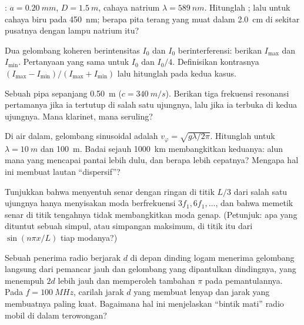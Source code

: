 \begin{exercise}[$\star\star$]\label{exo:b1:wave-propagation:7}
: $a = \qty{0.20}{mm}$, $D = \qty{1.5}{m}$, cahaya natrium
$\lambda = \qty{589}{nm}$. Hitunglah ; lalu untuk
cahaya biru pada \qty{450}{nm}; berapa pita terang yang muat dalam
\qty{2.0}{cm} di sekitar pusatnya dengan lampu natrium itu?
\end{exercise}

\begin{exercise}[$\star\star$]\label{exo:b1:wave-propagation:8}
Dua gelombang koheren berintensitas $I_0$ dan $I_0$ berinterferensi:
berikan $I_{\max}$ dan $I_{\min}$. Pertanyaan yang sama untuk $I_0$ dan
$I_0/4$. Definisikan kontrasnya
$(I_{\max} - I_{\min})/(I_{\max} + I_{\min})$ lalu hitunglah pada kedua kasus.
\end{exercise}

\begin{exercise}[$\star\star$]\label{exo:b1:wave-propagation:9}
Sebuah pipa sepanjang \qty{0.50}{m} ($c = \qty{340}{m/s}$). Berikan tiga
frekuensi resonansi pertamanya jika ia tertutup di salah satu ujungnya,
lalu jika ia terbuka di kedua ujungnya. Mana klarinet, mana seruling?
\end{exercise}

\begin{exercise}[$\star\star\star$]\label{exo:b1:wave-propagation:10}
Di air dalam,  gelombang sinusoidal adalah
$v_\varphi = \sqrt{g\lambda/2\pi}$. Hitunglah untuk $\lambda = \qty{10}{m}$
dan \qty{100}{m}. Badai sejauh \qty{1000}{km} membangkitkan keduanya:
alun mana yang mencapai pantai lebih dulu, dan berapa lebih cepatnya?
Mengapa hal ini membuat lautan ``dispersif''?
\end{exercise}

\begin{exercise}[$\star\star\star$]\label{exo:b1:wave-propagation:11}
Tunjukkan bahwa menyentuh senar dengan ringan di titik $L/3$ dari salah
satu ujungnya hanya menyisakan moda berfrekuensi $3f_1, 6f_1, \dots$,
dan bahwa memetik senar di titik tengahnya tidak membangkitkan moda
genap. (Petunjuk: apa yang dituntut sebuah simpul, atau simpangan
maksimum, di titik itu dari $\sin(n\pi x/L)$ tiap modanya?)
\end{exercise}

\begin{exercise}[$\star\star\star$]\label{exo:b1:wave-propagation:12}
Sebuah penerima radio berjarak $d$ di depan dinding logam menerima
gelombang langsung dari pemancar jauh dan gelombang yang dipantulkan
dindingnya, yang menempuh $2d$ lebih jauh dan memperoleh tambahan 
$\pi$ pada pemantulannya. Pada $f = \qty{100}{MHz}$, carilah jarak $d$
yang membuat  lenyap dan jarak yang membuatnya paling kuat.
Bagaimana hal ini menjelaskan ``bintik mati'' radio mobil di dalam terowongan?
\end{exercise}

